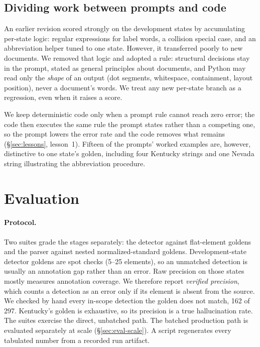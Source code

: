 \documentclass[11pt]{article}
\begin{document}
\subsection{Dividing work between prompts and code}
\label{sec:method-llm-first}

An earlier revision scored strongly on the development states by accumulating per-state logic: regular expressions for label words, a collision special case, and an abbreviation helper tuned to one state. However, it transferred poorly to new documents. We removed that logic and adopted a rule: structural decisions stay in the prompt, stated as general principles about documents, and Python may read only the \emph{shape} of an output (dot segments, whitespace, containment, layout position), never a document's words. We treat any new per-state branch as a regression, even when it raises a score.

We keep deterministic code only when a prompt rule cannot reach zero error; the code then executes the same rule the prompt states rather than a competing one, so the prompt lowers the error rate and the code removes what remains (\S\ref{sec:lessons}, lesson~1). Fifteen of the prompts' worked examples are, however, distinctive to one state's golden, including four Kentucky strings and one Nevada string illustrating the abbreviation procedure.

\section{Evaluation}
\label{sec:eval}

\paragraph{Protocol.} Two suites grade the stages separately: the detector against flat-element goldens and the parser against nested normalized-standard goldens. Development-state detector goldens are spot checks (5--25 elements), so an unmatched detection is usually an annotation gap rather than an error. Raw precision on those states mostly measures annotation coverage. We therefore report \emph{verified precision}, which counts a detection as an error only if its element is absent from the source. We checked by hand every in-scope detection the golden does not match, 162 of 297. Kentucky's golden is exhaustive, so its precision is a true hallucination rate. The suites exercise the direct, unbatched path. The batched production path is evaluated separately at scale (\S\ref{sec:eval-scale}). A script regenerates every tabulated number from a recorded run artifact.
\end{document}
